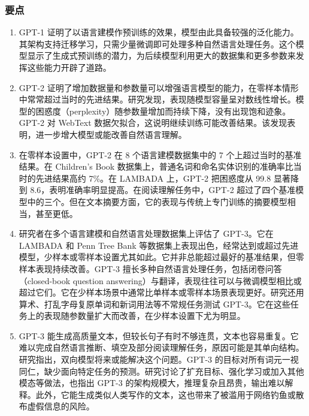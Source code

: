 \subsubsection{要点}
\begin{keypoint}
\begin{enumerate}
\item GPT-1 证明了以语言建模作预训练的效果，模型由此具备较强的泛化能力。其架构支持迁移学习，只需少量微调即可处理多种自然语言处理任务。这个模型显示了生成式预训练的潜力，为后续模型利用更大的数据集和更多参数来发挥这些能力开辟了道路。
\item GPT-2 证明了增加数据量和参数量可以增强语言模型的能力，在零样本情形中常常超过当时的先进结果。研究发现，表现随模型容量呈对数线性增长。模型的困惑度（perplexity）随参数量增加而持续下降，没有出现饱和迹象。GPT-2 对 WebText 数据欠拟合，这说明继续训练可能改善结果。该发现表明，进一步增大模型或能改善自然语言理解。
\item 在零样本设置中，GPT-2 在 8 个语言建模数据集中的 7 个上超过当时的基准结果。在 Children’s Book 数据集上，普通名词和命名实体识别的准确率比当时的先进结果高约 7\%。在 LAMBADA 上，GPT-2 把困惑度从 99.8 显著降到 8.6，表明准确率明显提高。在阅读理解任务中，GPT-2 超过了四个基准模型中的三个。但在文本摘要方面，它的表现与传统上专门训练的摘要模型相当，甚至更低。
\item 研究者在多个语言建模和自然语言处理数据集上评估了 GPT-3。它在 LAMBADA 和 Penn Tree Bank 等数据集上表现出色，经常达到或超过先进模型，少样本或零样本设置尤其如此。它并非总能超过最好的基准结果，但零样本表现持续改善。GPT-3 擅长多种自然语言处理任务，包括闭卷问答（closed-book question answering）与翻译，表现往往可以与微调模型相比或超过它们。它在少样本场景中通常比单样本或零样本场景表现更好。研究还用算术、打乱字母复原单词和新词用法等不常规任务测试 GPT-3。它在这些任务上的表现随参数量扩大而改善，在少样本设置下尤为明显。
\item GPT-3 能生成高质量文本，但较长句子有时不够连贯，文本也容易重复。它难以完成自然语言推断、填空及部分阅读理解任务，原因可能是其单向结构。研究指出，双向模型将来或能解决这个问题。GPT-3 的目标对所有词元一视同仁，缺少面向特定任务的预测。研究讨论了扩充目标、强化学习或加入其他模态等做法，也指出 GPT-3 的架构规模大，推理复杂且昂贵，输出难以解释。此外，它能生成类似人类写作的文本，这也带来了被滥用于网络钓鱼或散布虚假信息的风险。
\end{enumerate}
\end{keypoint}

